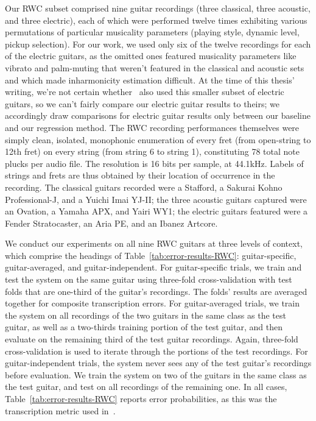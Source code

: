 \documentclass[12pt]{cmuthesis}
\begin{document}
Our RWC subset comprised nine guitar recordings (three classical, three acoustic, and three electric), each of which were performed twelve times exhibiting various permutations of particular musicality parameters (playing style, dynamic level, pickup selection). For our work, we used only six of the twelve recordings for each of the electric guitars, as the omitted ones featured musicality parameters like vibrato and palm-muting that weren't featured in the classical and acoustic sets and which made inharmonicity estimation difficult. At the time of this thesis' writing, we're not certain whether~\cite{barbanchoi2012} also used this smaller subset of electric guitars, so we can't fairly compare our electric guitar results to theirs; we accordingly draw comparisons for electric guitar results only between our baseline and our regression method. The RWC recording performances themselves were simply clean, isolated, monophonic enumeration of every fret (from open-string to 12th fret) on every string (from string 6 to string 1), constituting 78 total note plucks per audio file. The resolution is 16 bits per sample, at 44.1kHz. Labels of strings and frets are thus obtained by their location of occurrence in the recording. The classical guitars recorded were a Stafford, a Sakurai Kohno Professional-J, and a Yuichi Imai YJ-II; the three acoustic guitars captured were an Ovation, a Yamaha APX, and Yairi WY1; the electric guitars featured were a Fender Stratocaster, an Aria PE, and an Ibanez Artcore.


We conduct our experiments on all nine RWC guitars at three levels of context, which comprise the headings of Table~\ref{tab:error-results-RWC}: guitar-specific, guitar-averaged, and guitar-independent. For guitar-specific trials, we train and test the system on the same guitar using three-fold cross-validation with test folds that are one-third of the guitar's recordings. The folds' results are averaged together for composite transcription errors. For guitar-averaged trials, we train the system on all recordings of the two guitars in the same class as the test guitar, as well as a two-thirds training portion of the test guitar, and then evaluate on the remaining third of the test guitar recordings. Again, three-fold cross-validation is used to iterate through the portions of the test recordings. For guitar-independent trials, the system never sees any of the test guitar's recordings before evaluation. We train the system on two of the guitars in the same class as the test guitar, and test on all recordings of the remaining one. In all cases, Table~\ref{tab:error-results-RWC} reports error probabilities, as this was the transcription metric used in~\cite{barbanchoi2012}.
\end{document}
